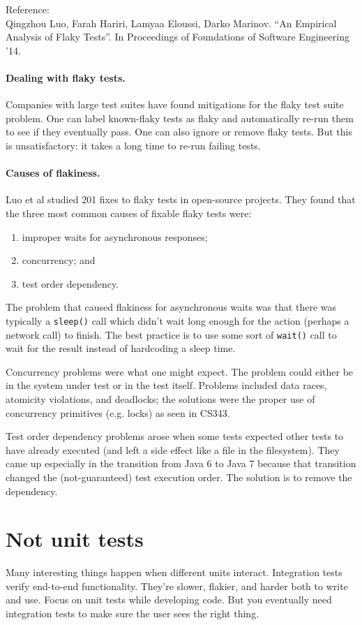 \documentclass[11pt]{article}
\begin{document}
Reference:\\
Qingzhou Luo, Farah Hariri, Lamyaa Eloussi, Darko Marinov. ``An Empirical Analysis of Flaky Tests''. In Proceedings of Foundations of Software Engineering '14.

\paragraph{Dealing with flaky tests.} Companies with large test suites have found mitigations
for the flaky test suite problem. One can label known-flaky tests as flaky and automatically
re-run them to see if they eventually pass. One can also ignore or remove flaky tests.
But this is unsatisfactory: it takes a long time to re-run failing tests.

\paragraph{Causes of flakiness.} Luo et al studied 201 fixes to flaky tests in open-source
projects. They found that the three most common causes of fixable flaky tests were:
\begin{enumerate}[noitemsep]
    \item improper waits for asynchronous responses;
    \item concurrency; and
    \item test order dependency.
\end{enumerate}

The problem that caused flakiness for asynchronous waits was that there was typically a
{\tt sleep()} call which didn't wait long enough for the action (perhaps a network call)
to finish. The best practice is to use some sort of {\tt wait()} call to wait for the result
instead of hardcoding a sleep time.

Concurrency problems were what one might expect. The problem could either be in the system under
test or in the test itself. Problems included data races, atomicity violations, and deadlocks;
the solutions were the proper use of concurrency primitives (e.g. locks) as seen in CS343.

Test order dependency problems arose when some tests expected other tests to have already
executed (and left a side effect like a file in the filesystem). They came up especially 
in the transition from Java 6 to Java 7 because that transition changed the (not-guaranteed)
test execution order. The solution is to remove the dependency.

\section*{Not unit tests}
Many interesting things happen when different units interact.
Integration tests verify end-to-end functionality. They're slower, flakier, and harder both
to write and use. Focus on unit tests while developing code. But you eventually need
integration tests to make sure the user sees the right thing.




\end{document}
